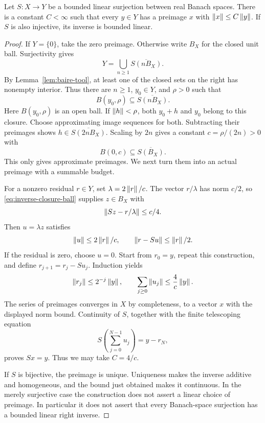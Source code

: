 \begin{lemma}\label{lem:inverse-tool}
Let \(S:X\to Y\) be a bounded linear surjection between real Banach spaces. There is a constant \(C<\infty\) such that every \(y\in Y\) has a preimage \(x\) with \(\left\lVert x\right\rVert\le C\left\lVert y\right\rVert\). If \(S\) is also injective, its inverse is bounded linear.
\end{lemma}
\begin{proof}
If \(Y=\{0\}\), take the zero preimage. Otherwise write \(B_X\) for the closed unit ball. Surjectivity gives
\[
 Y=\bigcup_{n\ge1}\overline{S(nB_X)}.
\]
By Lemma~\ref{lem:baire-tool}, at least one of the closed sets on the right has nonempty interior. Thus there are \(n\ge1\), \(y_0\in Y\), and \(\rho>0\) such that
\[
 B(y_0,\rho)\subseteq\overline{S(nB_X)}.
\]
Here \(B(y_0,\rho)\) is an open ball. If \(\left\lVert h\right\rVert<\rho\), both \(y_0+h\) and \(y_0\) belong to this closure. Choose approximating image sequences for both. Subtracting their preimages shows \(h\in\overline{S(2nB_X)}\). Scaling by \(2n\) gives a constant \(c=\rho/(2n)>0\) with
\begin{equation}\label{eq:inverse-closure-ball}
 B(0,c)\subseteq\overline{S(B_X)}.
\end{equation}
This only gives approximate preimages. We next turn them into an actual preimage with a summable budget.

For a nonzero residual \(r\in Y\), set \(\lambda=2\left\lVert r\right\rVert/c\). The vector \(r/\lambda\) has norm \(c/2\), so \eqref{eq:inverse-closure-ball} supplies \(z\in B_X\) with
\[
 \left\lVert Sz-r/\lambda\right\rVert\le c/4.
\]
Then \(u=\lambda z\) satisfies
\[
 \left\lVert u\right\rVert\le 2\left\lVert r\right\rVert/c,\qquad
 \left\lVert r-Su\right\rVert\le\left\lVert r\right\rVert/2.
\]
If the residual is zero, choose \(u=0\). Start from \(r_0=y\), repeat this construction, and define \(r_{j+1}=r_j-Su_j\). Induction yields
\[
 \left\lVert r_j\right\rVert\le2^{-j}\left\lVert y\right\rVert,\qquad
 \sum_{j\ge0}\left\lVert u_j\right\rVert\le\frac{4}{c}\left\lVert y\right\rVert.
\]
The series of preimages converges in \(X\) by completeness, to a vector \(x\) with the displayed norm bound. Continuity of \(S\), together with the finite telescoping equation
\[
 S\left(\sum_{j=0}^{N-1}u_j\right)=y-r_N,
\]
proves \(Sx=y\). Thus we may take \(C=4/c\).

If \(S\) is bijective, the preimage is unique. Uniqueness makes the inverse additive and homogeneous, and the bound just obtained makes it continuous. In the merely surjective case the construction does not assert a linear choice of preimage. In particular it does not assert that every Banach-space surjection has a bounded linear right inverse.
\end{proof}

